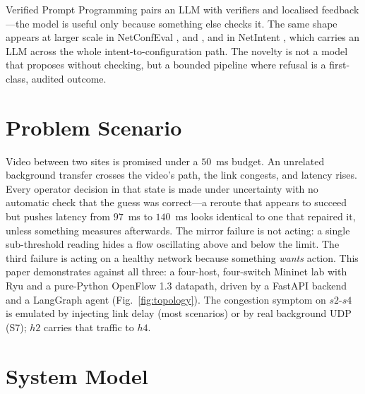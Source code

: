 \documentclass[conference]{IEEEtran}
\begin{document}
Verified Prompt Programming \cite{mondal2023verified} pairs an LLM with
verifiers and localised feedback---the model is useful only because something
else checks it. The same shape appears at larger scale in NetConfEval
\cite{wang2024netconfeval}, \cite{wang2025confucius} and
\cite{protogeros2026repair}, and in NetIntent
\cite{hossain2025netintent}, which carries an LLM across the whole
intent-to-configuration path. The novelty is not a model that proposes
without checking, but a bounded pipeline where refusal is a first-class,
audited outcome.

\section{Problem Scenario}

Video between two sites is promised under a $50$~ms budget. An unrelated
background transfer crosses the video's path, the link congests, and
latency rises. Every operator decision in that state is made under
uncertainty with no automatic check that the guess was correct---a reroute
that appears to succeed but pushes latency from $97$~ms to $140$~ms looks
identical to one that repaired it, unless something measures afterwards.
The mirror failure is not acting: a single sub-threshold reading hides a
flow oscillating above and below the limit. The third failure is acting on
a healthy network because something \emph{wants} action. This paper
demonstrates against all three: a four-host, four-switch Mininet lab with
Ryu and a pure-Python OpenFlow 1.3 datapath, driven by a FastAPI backend
and a LangGraph agent (Fig.~\ref{fig:topology}). The congestion symptom on
$s2$-$s4$ is emulated by injecting link delay (most scenarios) or by real
background UDP (S7); $h2$ carries that traffic to $h4$.

\section{System Model}
\end{document}
